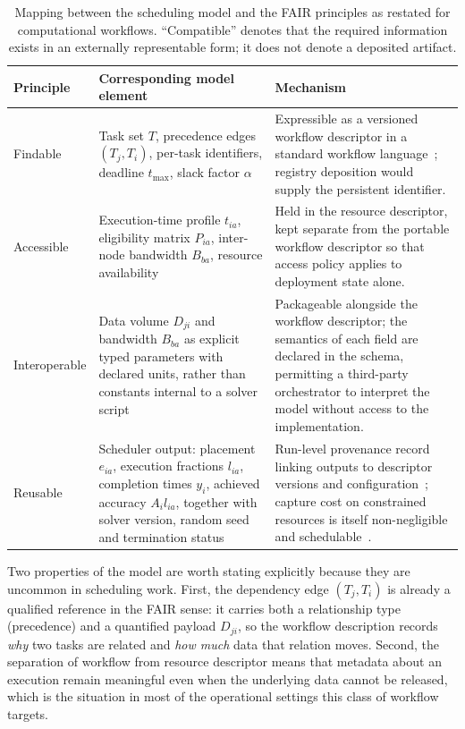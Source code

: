 \begin{table}[t]
\centering
\caption{Mapping between the scheduling model and the FAIR principles as restated for computational
workflows. ``Compatible'' denotes that the required information exists in an externally
representable form; it does not denote a deposited artifact.}
\label{tab:fair_mapping}
\small
\begin{tabular}{p{}p{}p{}}
\toprule
\textbf{Principle} & \textbf{Corresponding model element} & \textbf{Mechanism} \\
\midrule
Findable & Task set $T$, precedence edges $(T_j,T_i)$, per-task identifiers, deadline $t_{\max}$,
slack factor $\alpha$ & Expressible as a versioned workflow descriptor in a standard workflow
language~\cite{crusoe2022cwl}; registry deposition would supply the persistent identifier. \\
\addlinespace
Accessible & Execution-time profile $t_{ia}$, eligibility matrix $P_{ia}$, inter-node bandwidth
$B_{ba}$, resource availability & Held in the resource descriptor, kept separate from the portable
workflow descriptor so that access policy applies to deployment state alone. \\
\addlinespace
Interoperable & Data volume $D_{ji}$ and bandwidth $B_{ba}$ as explicit typed parameters with
declared units, rather than constants internal to a solver script & Packageable alongside the
workflow descriptor; the semantics of each field are declared in the schema, permitting a
third-party orchestrator to interpret the model without access to the implementation. \\
\addlinespace
Reusable & Scheduler output: placement $e_{ia}$, execution fractions $l_{ia}$, completion times
$y_i$, achieved accuracy $A_i l_{ia}$, together with solver version, random seed and termination
status & Run-level provenance record linking outputs to descriptor versions and
configuration~\cite{leo2024workflowruncrate}; capture cost on constrained resources is itself
non-negligible and schedulable~\cite{rosendo2023provlight}. \\
\bottomrule
\end{tabular}
\end{table}

Two properties of the model are worth stating explicitly because they are uncommon in scheduling
work. First, the dependency edge $(T_j,T_i)$ is already a qualified reference in the FAIR sense: it
carries both a relationship type (precedence) and a quantified payload $D_{ji}$, so the workflow
description records \emph{why} two tasks are related and \emph{how much} data that relation moves.
Second, the separation of workflow from resource descriptor means that metadata about an execution
remain meaningful even when the underlying data cannot be released, which is the situation in most
of the operational settings this class of workflow targets.


